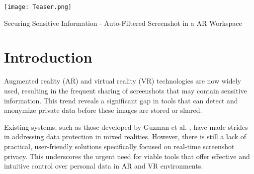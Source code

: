\documentclass[sigconf,authordraft]{acmart}
\begin{document}



\begin{teaserfigure}
  \texttt{[image: Teaser.png]}
  \caption{Securing Sensitive Information - Auto-Filtered Screenshot in a AR Workspace}
  \label{fig:teaser}
\end{teaserfigure}


\maketitle

\section{Introduction}

Augmented reality (AR) and virtual reality (VR) technologies are now widely used, resulting in the frequent sharing of screenshots that may contain sensitive information. This trend reveals a significant gap in tools that can detect and anonymize private data before these images are stored or shared.

Existing systems, such as those developed by Guzman et al. \cite{guzman2023privacy}, have made strides in addressing data protection in mixed realities. However, there is still a lack of practical, user-friendly solutions specifically focused on real-time screenshot privacy. This underscores the urgent need for viable tools that offer effective and intuitive control over personal data in AR and VR environments.
\end{document}

